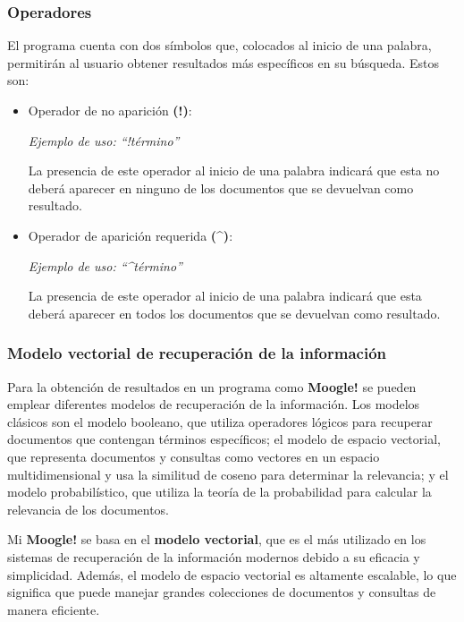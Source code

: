 \documentclass[12pt, letterpaper]{article}
\begin{document}
        \subsubsection{Operadores}
        El programa cuenta con dos símbolos que, colocados al inicio de una palabra, permitirán al usuario obtener resultados más específicos en su búsqueda. Estos son:
        \newpage
        \begin{itemize}
            \item Operador de no aparición \textbf{(!)}:
            
            \textit{Ejemplo de uso: “!término”}
           
            La presencia de este operador al inicio de una palabra indicará que esta no deberá 	aparecer en ninguno de los documentos que se devuelvan como resultado.
            \item Operador de aparición requerida \textbf{(\textasciicircum)}:
            
            \textit{Ejemplo de uso: “\textasciicircum término”}

            La presencia de este operador al inicio de una palabra indicará que esta deberá aparecer en todos los documentos que se devuelvan como resultado.
        \end{itemize}
        \subsubsection{Modelo vectorial de recuperación de la información}
        Para la obtención de resultados en un programa como \textbf{Moogle!} se pueden emplear diferentes modelos de recuperación de la información. Los modelos clásicos son el modelo booleano, que utiliza operadores lógicos para recuperar documentos que contengan términos específicos; el modelo de espacio vectorial, que representa documentos y consultas como vectores en un espacio multidimensional y usa la similitud de coseno para determinar la relevancia; y el modelo probabilístico, que utiliza la teoría de la probabilidad para calcular la relevancia de los documentos.
        
        Mi \textbf{Moogle!} se basa en el \textbf{modelo vectorial}, que es el más utilizado en los sistemas de recuperación de la información modernos debido a su eficacia y simplicidad. Además, el modelo de espacio vectorial es altamente escalable, lo que significa que puede manejar grandes colecciones de documentos y consultas de manera eficiente.
        
\end{document}
